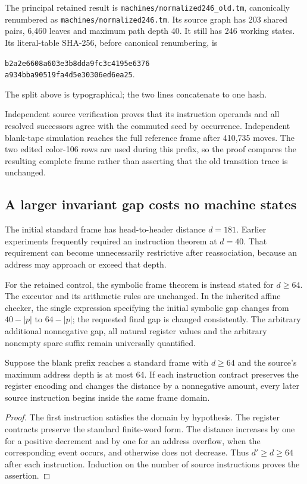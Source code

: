 The principal retained result is
\texttt{machines/normalized246\_old.tm}, canonically renumbered as
\texttt{machines/normalized246.tm}.  Its source graph has 203 shared pairs,
6,460 leaves and maximum path depth 40.  It still has 246 working states.
Its literal-table SHA-256, before canonical renumbering, is
\begin{center}\small
\texttt{b2a2e6608a603e3b8dda9fc3c4195e6376}\\
\texttt{a934bba90519fa4d5e30306ed6ea25}.
\end{center}
The split above is typographical; the two lines concatenate to one hash.

Independent source verification proves that its instruction operands and
all resolved successors agree with the commuted seed by occurrence.
Independent blank-tape simulation reaches the full reference frame after
410,735 moves.  The two edited color-106 rows are used during this prefix,
so the proof compares the resulting complete frame rather than asserting
that the old transition trace is unchanged.

\subsection{A larger invariant gap costs no machine states}

The initial standard frame has head-to-header distance $d=181$.  Earlier
experiments frequently required an instruction theorem at $d=40$.  That
requirement can become unnecessarily restrictive after reassociation,
because an address may approach or exceed that depth.

For the retained control, the symbolic frame theorem is instead stated
for $d\geq64$.  The executor and its arithmetic rules are unchanged.  In
the inherited affine checker, the single expression specifying the
initial symbolic gap changes from $40-|p|$ to $64-|p|$; the requested final
gap is changed consistently.  The arbitrary additional nonnegative gap,
all natural register values and the arbitrary nonempty spare suffix remain
universally quantified.

\begin{lemma}
Suppose the blank prefix reaches a standard frame with $d\geq64$ and the
source's maximum address depth is at most 64.  If each instruction contract
preserves the register encoding and changes the distance by a nonnegative
amount, every later source instruction begins inside the same frame domain.
\end{lemma}
\begin{proof}
The first instruction satisfies the domain by hypothesis.  The register
contracts preserve the standard finite-word form.  The distance increases
by one for a positive decrement and by one for an address overflow, when
the corresponding event occurs, and otherwise does not decrease.  Thus
$d'\geq d\geq64$ after each instruction.  Induction on the number of source
instructions proves the assertion.
\end{proof}

